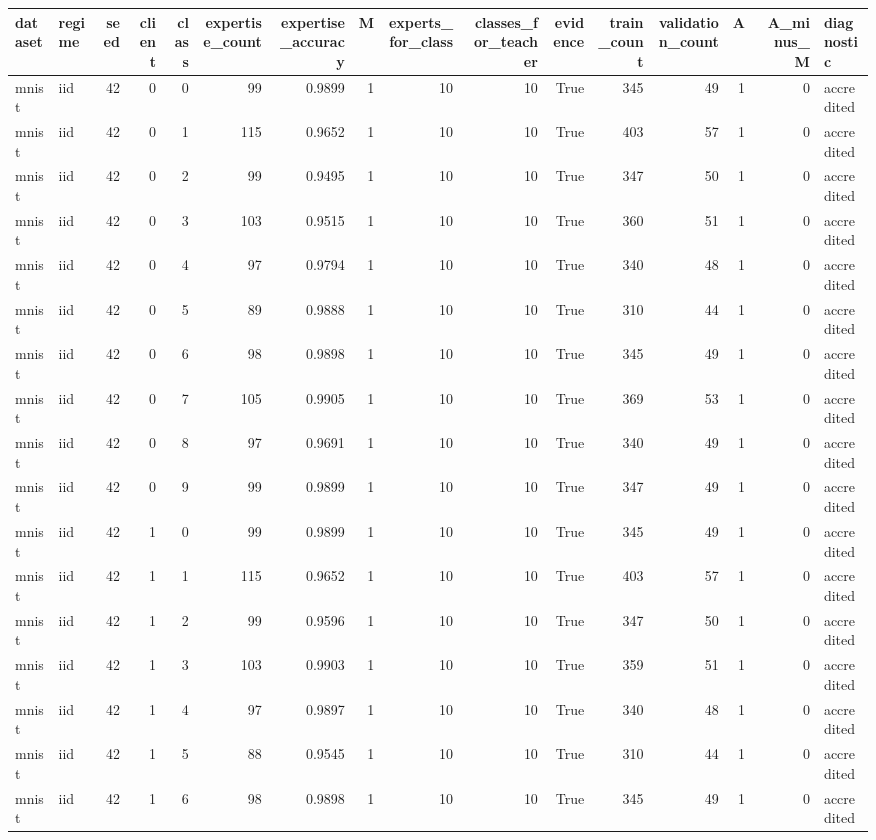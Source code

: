 \begin{tabular}{llrrrrrrrrrrrrrl}
\toprule
dataset & regime & seed & client & class & expertise\_count & expertise\_accuracy & M & experts\_for\_class & classes\_for\_teacher & evidence & train\_count & validation\_count & A & A\_minus\_M & diagnostic \\
\midrule
mnist & iid & 42 & 0 & 0 & 99 & 0.9899 & 1 & 10 & 10 & True & 345 & 49 & 1 & 0 & accredited \\
mnist & iid & 42 & 0 & 1 & 115 & 0.9652 & 1 & 10 & 10 & True & 403 & 57 & 1 & 0 & accredited \\
mnist & iid & 42 & 0 & 2 & 99 & 0.9495 & 1 & 10 & 10 & True & 347 & 50 & 1 & 0 & accredited \\
mnist & iid & 42 & 0 & 3 & 103 & 0.9515 & 1 & 10 & 10 & True & 360 & 51 & 1 & 0 & accredited \\
mnist & iid & 42 & 0 & 4 & 97 & 0.9794 & 1 & 10 & 10 & True & 340 & 48 & 1 & 0 & accredited \\
mnist & iid & 42 & 0 & 5 & 89 & 0.9888 & 1 & 10 & 10 & True & 310 & 44 & 1 & 0 & accredited \\
mnist & iid & 42 & 0 & 6 & 98 & 0.9898 & 1 & 10 & 10 & True & 345 & 49 & 1 & 0 & accredited \\
mnist & iid & 42 & 0 & 7 & 105 & 0.9905 & 1 & 10 & 10 & True & 369 & 53 & 1 & 0 & accredited \\
mnist & iid & 42 & 0 & 8 & 97 & 0.9691 & 1 & 10 & 10 & True & 340 & 49 & 1 & 0 & accredited \\
mnist & iid & 42 & 0 & 9 & 99 & 0.9899 & 1 & 10 & 10 & True & 347 & 49 & 1 & 0 & accredited \\
mnist & iid & 42 & 1 & 0 & 99 & 0.9899 & 1 & 10 & 10 & True & 345 & 49 & 1 & 0 & accredited \\
mnist & iid & 42 & 1 & 1 & 115 & 0.9652 & 1 & 10 & 10 & True & 403 & 57 & 1 & 0 & accredited \\
mnist & iid & 42 & 1 & 2 & 99 & 0.9596 & 1 & 10 & 10 & True & 347 & 50 & 1 & 0 & accredited \\
mnist & iid & 42 & 1 & 3 & 103 & 0.9903 & 1 & 10 & 10 & True & 359 & 51 & 1 & 0 & accredited \\
mnist & iid & 42 & 1 & 4 & 97 & 0.9897 & 1 & 10 & 10 & True & 340 & 48 & 1 & 0 & accredited \\
mnist & iid & 42 & 1 & 5 & 88 & 0.9545 & 1 & 10 & 10 & True & 310 & 44 & 1 & 0 & accredited \\
mnist & iid & 42 & 1 & 6 & 98 & 0.9898 & 1 & 10 & 10 & True & 345 & 49 & 1 & 0 & accredited \\

\end{tabular}
